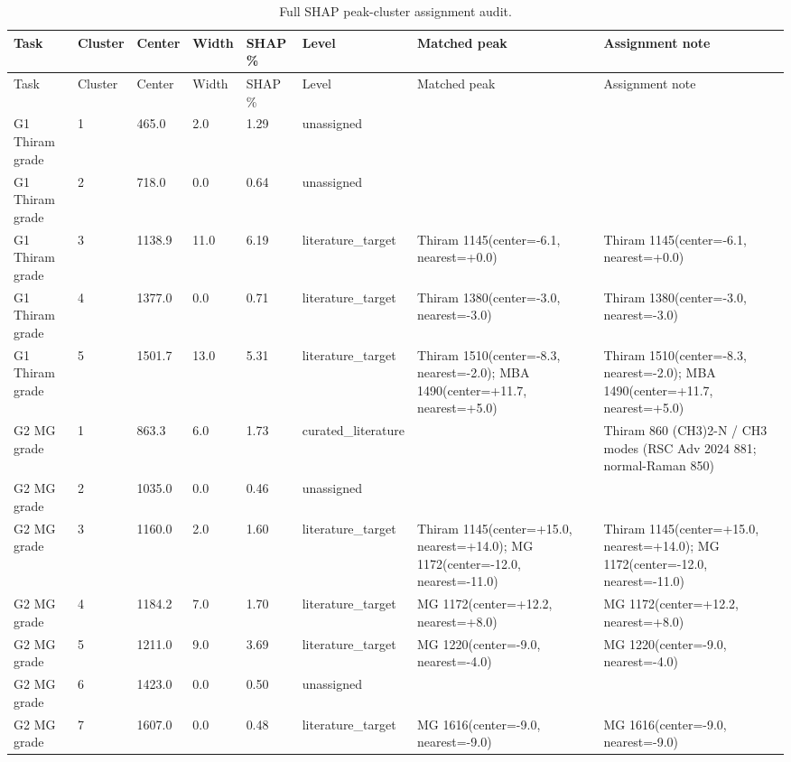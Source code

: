 {\tiny
\setlength{\tabcolsep}{2.5pt}
\renewcommand{\arraystretch}{1.08}
\begin{longtable}{L{2.1cm}L{1.0cm}L{1.25cm}L{1.0cm}L{1.1cm}L{2.0cm}L{2.2cm}L{3.8cm}}
\caption{Full SHAP peak-cluster assignment audit.}\label{tab:s4_shap_assignment}\\
\toprule
Task & Cluster & Center & Width & SHAP \% & Level & Matched peak & Assignment note \\
\midrule
\endfirsthead
\toprule
Task & Cluster & Center & Width & SHAP \% & Level & Matched peak & Assignment note \\
\midrule
\endhead
\endfoot
\bottomrule
\endlastfoot
G1 Thiram grade & 1 & 465.0 & 2.0 & 1.29 & unassigned &  &  \\
G1 Thiram grade & 2 & 718.0 & 0.0 & 0.64 & unassigned &  &  \\
G1 Thiram grade & 3 & 1138.9 & 11.0 & 6.19 & literature\_target & Thiram 1145(center=-6.1, nearest=+0.0) & Thiram 1145(center=-6.1, nearest=+0.0) \\
G1 Thiram grade & 4 & 1377.0 & 0.0 & 0.71 & literature\_target & Thiram 1380(center=-3.0, nearest=-3.0) & Thiram 1380(center=-3.0, nearest=-3.0) \\
G1 Thiram grade & 5 & 1501.7 & 13.0 & 5.31 & literature\_target & Thiram 1510(center=-8.3, nearest=-2.0); MBA 1490(center=+11.7, nearest=+5.0) & Thiram 1510(center=-8.3, nearest=-2.0); MBA 1490(center=+11.7, nearest=+5.0) \\
G2 MG grade & 1 & 863.3 & 6.0 & 1.73 & curated\_literature &  & Thiram 860 (CH3)2-N / CH3 modes (RSC Adv 2024 881; normal-Raman 850) \\
G2 MG grade & 2 & 1035.0 & 0.0 & 0.46 & unassigned &  &  \\
G2 MG grade & 3 & 1160.0 & 2.0 & 1.60 & literature\_target & Thiram 1145(center=+15.0, nearest=+14.0); MG 1172(center=-12.0, nearest=-11.0) & Thiram 1145(center=+15.0, nearest=+14.0); MG 1172(center=-12.0, nearest=-11.0) \\
G2 MG grade & 4 & 1184.2 & 7.0 & 1.70 & literature\_target & MG 1172(center=+12.2, nearest=+8.0) & MG 1172(center=+12.2, nearest=+8.0) \\
G2 MG grade & 5 & 1211.0 & 9.0 & 3.69 & literature\_target & MG 1220(center=-9.0, nearest=-4.0) & MG 1220(center=-9.0, nearest=-4.0) \\
G2 MG grade & 6 & 1423.0 & 0.0 & 0.50 & unassigned &  &  \\
G2 MG grade & 7 & 1607.0 & 0.0 & 0.48 & literature\_target & MG 1616(center=-9.0, nearest=-9.0) & MG 1616(center=-9.0, nearest=-9.0) \\

\end{longtable}}
